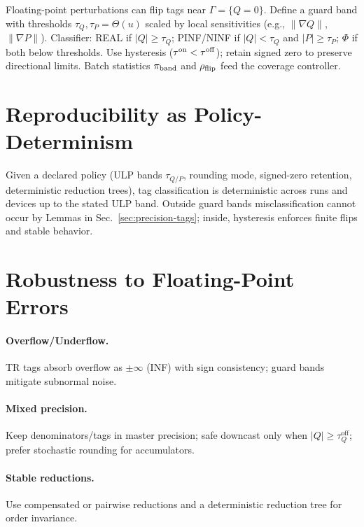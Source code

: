 \documentclass[twoside,11pt]{article}
\newcommand{\trReal}{\textsc{REAL}}
\newcommand{\trPINF}{\textsc{PINF}}
\newcommand{\trNINF}{\textsc{NINF}}
\newcommand{\trPHI}{\textsc{$\Phi$}}
\newcommand{\TAGREAL}{\trReal}
\newcommand{\TAGPINF}{\trPINF}
\newcommand{\TAGNINF}{\trNINF}
\newcommand{\TAGPHI}{\trPHI}
\begin{document}
Floating-point perturbations can flip tags near $\Gamma=\{Q=0\}$. Define a guard band with thresholds $\tau_Q,\tau_P=\Theta(u)$ scaled by local sensitivities (e.g., $\|\nabla Q\|$, $\|\nabla P\|$). Classifier: \TAGREAL{} if $|Q|\ge\tau_Q$; \TAGPINF/\TAGNINF{} if $|Q|<\tau_Q$ and $|P|\ge\tau_P$; \TAGPHI{} if both below thresholds. Use hysteresis ($\tau^{\rm on}<\tau^{\rm off}$); retain signed zero to preserve directional limits. Batch statistics $\pi_{\rm band}$ and $\rho_{\rm flip}$ feed the coverage controller.

\section*{Reproducibility as Policy-Determinism}
\label{sec:policy-determinism}
Given a declared policy (ULP bands $\tau_{Q/P}$, rounding mode, signed-zero retention, deterministic reduction trees), tag classification is deterministic across runs and devices up to the stated ULP band. Outside guard bands misclassification cannot occur by Lemmas in Sec.~\ref{sec:precision-tags}; inside, hysteresis enforces finite flips and stable behavior.

\section*{Robustness to Floating-Point Errors}
\label{sec:fp-robustness}
\paragraph{Overflow/Underflow.} TR tags absorb overflow as $\pm\infty$ (INF) with sign consistency; guard bands mitigate subnormal noise.\par
\paragraph{Mixed precision.} Keep denominators/tags in master precision; safe downcast only when $|Q|\ge \tau_Q^{\mathrm{off}}$; prefer stochastic rounding for accumulators.\par
\paragraph{Stable reductions.} Use compensated or pairwise reductions and a deterministic reduction tree for order invariance.\par
\end{document}
